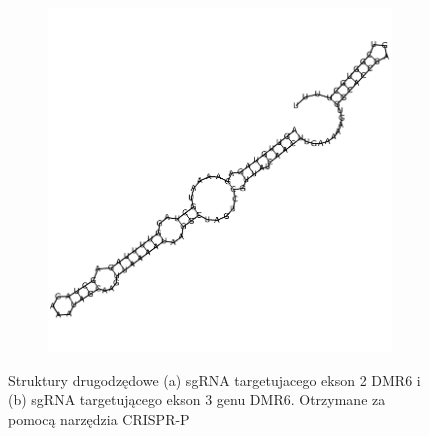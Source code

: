 \documentclass[twoside, a4paper]{article}
\begin{document}
\begin{figure}[h]
\begin{subfigure}[t]{0.45\textwidth}
		\includegraphics[width=\textwidth]{./figures/gRNA-ekson2.pdf}
		\caption{}
	\end{subfigure}
	\caption{Struktury drugodzędowe (a) sgRNA targetujacego ekson 2 DMR6 i (b) sgRNA targetującego ekson 3 genu DMR6. Otrzymane za pomocą narzędzia CRISPR-P}
\end{figure}

\nocite{Lei2014}

\printbibliography
\end{document}
